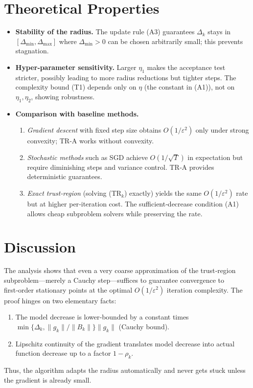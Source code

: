 \documentclass[11pt]{article}
\begin{document}
\section*{Theoretical Properties}
\begin{itemize}
\item \textbf{Stability of the radius.} The update rule (A3) guarantees $\Delta_k$ stays in $[\Delta_{\min},\Delta_{\max}]$ where $\Delta_{\min}>0$ can be chosen arbitrarily small; this prevents stagnation.
\item \textbf{Hyper‑parameter sensitivity.} Larger $\eta_1$ makes the acceptance test stricter, possibly leading to more radius reductions but tighter steps. The complexity bound (T1) depends only on $\eta$ (the constant in (A1)), not on $\eta_1,\eta_2$, showing robustness.
\item \textbf{Comparison with baseline methods.}
\begin{enumerate}[label=\alph*.,leftmargin=*,itemsep=0.2em]
\item \emph{Gradient descent} with fixed step size obtains $O(1/\varepsilon^{2})$ only under strong convexity; TR‑A works without convexity.
\item \emph{Stochastic methods} such as SGD achieve $O(1/\sqrt{T})$ in expectation but require diminishing steps and variance control. TR‑A provides deterministic guarantees.
\item \emph{Exact trust‑region} (solving (TR$_k$) exactly) yields the same $O(1/\varepsilon^{2})$ rate but at higher per‑iteration cost. The sufficient‑decrease condition (A1) allows cheap subproblem solvers while preserving the rate.
\end{enumerate}
\end{itemize}

\section*{Discussion}
The analysis shows that even a very coarse approximation of the trust‑region subproblem—merely a Cauchy step—suffices to guarantee convergence to first‑order stationary points at the optimal $O(1/\varepsilon^{2})$ iteration complexity.  The proof hinges on two elementary facts:
\begin{enumerate}[label=\roman*),leftmargin=*,itemsep=0.2em]
\item The model decrease is lower‑bounded by a constant times $\min\{\Delta_k,\|g_k\|/\|B_k\|\}\|g_k\|$ (Cauchy bound).
\item Lipschitz continuity of the gradient translates model decrease into actual function decrease up to a factor $1-\rho_k$.
\end{enumerate}
Thus, the algorithm adapts the radius automatically and never gets stuck unless the gradient is already small.
\end{document}
